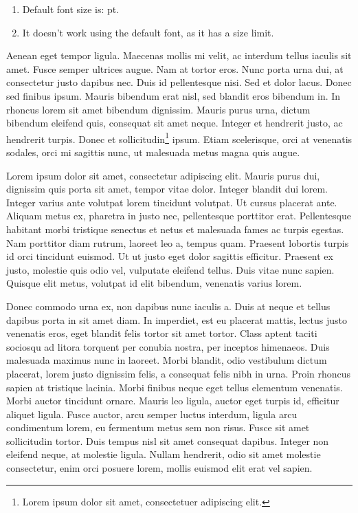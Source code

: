 \documentclass[twocolumn,10pt]{article}
\begin{document}
\renewcommand{\labelenumi}{(\alph{enumi})}
\begin{enumerate}
    \item Default font size is: \makeatletter\f@size\makeatother pt.
    
    \item It doesn't work using the default font, as it has a size limit.
\end{enumerate}    

Aenean eget tempor ligula. Maecenas mollis mi velit, ac interdum tellus iaculis sit amet. Fusce semper ultrices augue. Nam at tortor eros. Nunc porta urna dui, at consectetur justo dapibus nec. Duis id pellentesque nisi. Sed et dolor lacus. Donec sed finibus ipsum. Mauris bibendum erat nisl, sed blandit eros bibendum in. In rhoncus lorem sit amet bibendum dignissim. Mauris purus urna, dictum bibendum eleifend quis, consequat sit amet neque. Integer et hendrerit justo, ac hendrerit turpis. Donec et sollicitudin\footnote{Lorem ipsum dolor sit amet, consectetuer adipiscing elit.} ipsum. Etiam scelerisque, orci at venenatis sodales, orci mi sagittis nunc, ut malesuada metus magna quis augue. 


Lorem ipsum dolor sit amet, consectetur adipiscing elit. Mauris purus dui, dignissim quis porta sit amet, tempor vitae dolor. Integer blandit dui lorem. Integer varius ante volutpat lorem tincidunt volutpat. Ut cursus placerat ante. Aliquam metus ex, pharetra in justo nec, pellentesque porttitor erat. Pellentesque habitant morbi tristique senectus et netus et malesuada fames ac turpis egestas. Nam porttitor diam rutrum, laoreet leo a, tempus quam. Praesent lobortis turpis id orci tincidunt euismod. Ut ut justo eget dolor sagittis efficitur. Praesent ex justo, molestie quis odio vel, vulputate eleifend tellus. Duis vitae nunc sapien. Quisque elit metus, volutpat id elit bibendum, venenatis varius lorem.

Donec commodo urna ex, non dapibus nunc iaculis a. Duis at neque et tellus dapibus porta in sit amet diam. In imperdiet, est eu placerat mattis, lectus justo venenatis eros, eget blandit felis tortor sit amet tortor. Class aptent taciti sociosqu ad litora torquent per conubia nostra, per inceptos himenaeos. Duis malesuada maximus nunc in laoreet. Morbi blandit, odio vestibulum dictum placerat, lorem justo dignissim felis, a consequat felis nibh in urna. Proin rhoncus sapien at tristique lacinia. Morbi finibus neque eget tellus elementum venenatis. Morbi auctor tincidunt ornare. Mauris leo ligula, auctor eget turpis id, efficitur aliquet ligula. Fusce auctor, arcu semper luctus interdum, ligula arcu condimentum lorem, eu fermentum metus sem non risus. Fusce sit amet sollicitudin tortor. Duis tempus nisl sit amet consequat dapibus. Integer non eleifend neque, at molestie ligula. Nullam hendrerit, odio sit amet molestie consectetur, enim orci posuere lorem, mollis euismod elit erat vel sapien.
\end{document}
